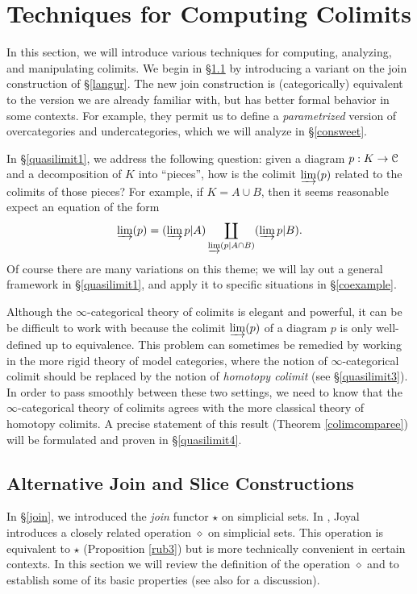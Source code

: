 \section{Techniques for Computing Colimits}\label{c4s2}

\setcounter{theorem}{0}

In this section, we will introduce various techniques for computing, analyzing, and manipulating colimits. We begin in \S \ref{quasilimit2} by introducing a variant on the join construction of \S \ref{langur}. The new join construction is (categorically) equivalent to the version we are already familiar with, but has better formal behavior in some contexts. For example, they permit us to define a {\em parametrized} version of overcategories and undercategories, which we will analyze in \S \ref{consweet}.

In \S \ref{quasilimit1}, we address the following question: given a diagram $p: K \rightarrow \calC$ and a decomposition of $K$ into ``pieces'', how is the colimit
$\injlim(p)$ related to the colimits of those pieces? For example, if $K = A \cup B$, then it seems reasonable expect an equation of the form
$$\colim(p) = ( \colim p|A ) \coprod_{ \colim(p| A \cap B)} (\colim p|B).$$ 
Of course there are many variations on this theme; we will lay out a general framework in \S \ref{quasilimit1}, and apply it to specific situations in \S \ref{coexample}.

Although the $\infty$-categorical theory of colimits is elegant and powerful, it can be be difficult to work with because the colimit $\colim(p)$ of a diagram $p$ is only well-defined up to equivalence.
This problem can sometimes be remedied by working in the more rigid theory of model categories, where the notion of $\infty$-categorical colimit should be replaced by the notion of {\it homotopy colimit} (see \S \ref{quasilimit3}). In order to pass smoothly between these two settings, we need to know that the $\infty$-categorical theory of colimits agrees with the more classical theory of homotopy colimits. A precise statement of this result (Theorem \ref{colimcomparee}) will be formulated and proven in \S \ref{quasilimit4}. 

\subsection{Alternative Join and Slice Constructions}\label{quasilimit2}

In \S \ref{join}, we introduced the {\em join} functor $\star$ on simplicial sets. In \cite{joyalnotpub}, Joyal introduces a closely related operation $\diamond$ on simplicial sets. This operation is equivalent to $\star$ (Proposition \ref{rub3}) but is more technically convenient in certain contexts. In this section we will review the definition of the operation $\diamond$ and to establish some of its basic properties (see also \cite{joyalnotpub} for a discussion).


